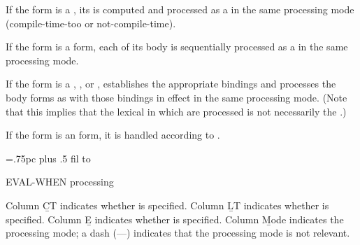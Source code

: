   If the form is a ,
its  is computed and processed as a 
 in
the same processing mode (compile-time-too or not-compile-time).
 
  If the form is a  form, each of its
body  is sequentially processed as a 
 in the same processing mode.
 
  If the form is a , 
, or , 
 establishes the appropriate bindings and processes the
body forms as  with those bindings in effect
in the same processing mode.  (Note that this implies that the lexical
 in which  are processed
is not necessarily the .)
 
  If the form is an  form, it is
handled according to \thenextfigure.

\boxfig
{=.75pc
\tabskip {} plus .5 fil
\offinterlineskip
\halign to }
\caption{EVAL-WHEN processing}
\endfig

Column \b{CT}   indicates whether  is specified.
Column \b{LT}   indicates whether  is specified.
Column \b{E}    indicates whether  is specified.  
Column \b{Mode} indicates the processing mode; 
		a dash (---) indicates that the processing mode is not relevant.
   
